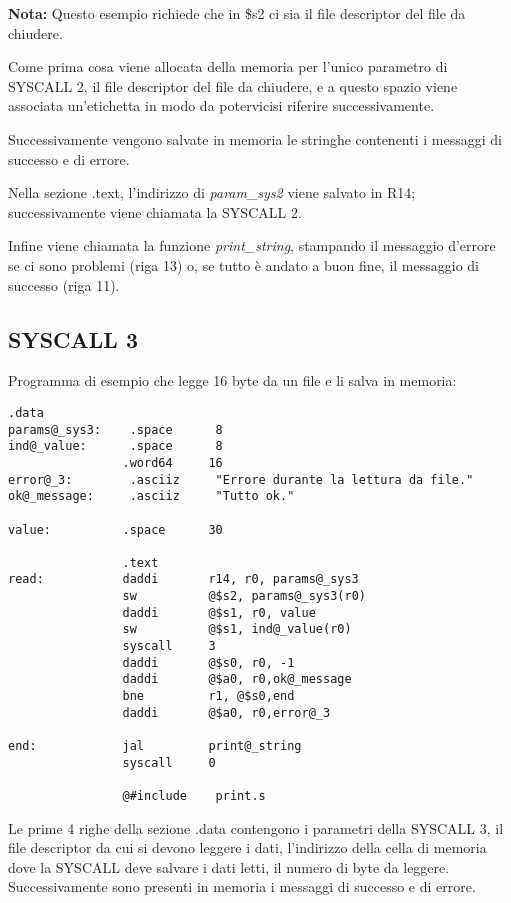 \documentclass[letterpaper,10pt,italian]{sphinxmanual}
\begin{document}
\textbf{Nota:} Questo esempio richiede che in \$s2 ci sia il file descriptor del
file da chiudere.

Come prima cosa viene allocata della memoria per l'unico parametro di SYSCALL
2, il file descriptor del file da chiudere, e a questo spazio viene associata
un'etichetta in modo da potervicisi riferire successivamente.

Successivamente vengono salvate in memoria le stringhe contenenti i messaggi
di successo e di errore.

Nella sezione .text, l'indirizzo di \emph{param\_sys2} viene salvato in R14;
successivamente viene chiamata la SYSCALL 2.

Infine viene chiamata la funzione \emph{print\_string}, stampando il messaggio
d'errore se ci sono problemi (riga 13) o, se tutto è andato a buon fine, il
messaggio di successo (riga 11).


\subsection{SYSCALL 3}
\label{examples:syscall-3}
Programma di esempio che legge 16 byte da un file e li salva in memoria:

\begin{Verbatim}[commandchars=@\[\]]
                .data
params@_sys3:    .space      8
ind@_value:      .space      8
                .word64     16
error@_3:        .asciiz     "Errore durante la lettura da file."
ok@_message:     .asciiz     "Tutto ok."

value:          .space      30

                .text
read:           daddi       r14, r0, params@_sys3
                sw          @$s2, params@_sys3(r0)
                daddi       @$s1, r0, value
                sw          @$s1, ind@_value(r0)
                syscall     3
                daddi       @$s0, r0, -1
                daddi       @$a0, r0,ok@_message
                bne         r1, @$s0,end
                daddi       @$a0, r0,error@_3

end:            jal         print@_string
                syscall     0

                @#include    print.s
\end{Verbatim}

Le prime 4 righe della sezione .data contengono i parametri della SYSCALL 3,
il file descriptor da cui si devono leggere i dati, l'indirizzo della cella di
memoria dove la SYSCALL deve salvare i dati letti, il numero di byte da
leggere. Successivamente sono presenti in memoria i messaggi di successo e di
errore.
\end{document}
